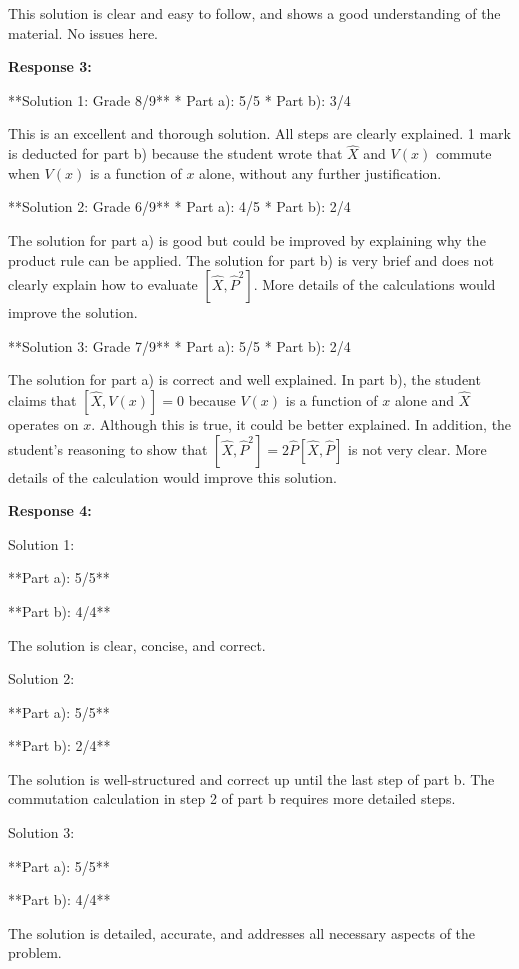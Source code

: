 \documentclass[a4paper,11pt]{article}
\begin{document}
This solution is clear and easy to follow, and shows a good understanding of the material. No issues here.

\bigskip    
\textbf{Response 3:}

**Solution 1: Grade 8/9**
*   Part a): 5/5
*   Part b): 3/4

This is an excellent and thorough solution. All steps are clearly explained. 1 mark is deducted for part b) because the student wrote that \(\hat{X}\) and \(V(x)\) commute when \(V(x)\) is a function of \(x\) alone, without any further justification.

**Solution 2: Grade 6/9**
*   Part a): 4/5
*   Part b): 2/4

The solution for part a) is good but could be improved by explaining why the product rule can be applied. The solution for part b) is very brief and does not clearly explain how to evaluate \(\left[ \hat{X}, \hat{P}^2 \right]\). More details of the calculations would improve the solution.

**Solution 3: Grade 7/9**
*   Part a): 5/5
*   Part b): 2/4

The solution for part a) is correct and well explained. In part b), the student claims that \(\left[ \hat{X}, V(x)\right] = 0\) because \(V(x)\) is a function of \(x\) alone and \(\hat{X}\) operates on \(x\). Although this is true, it could be better explained. In addition, the student's reasoning to show that \(\left[ \hat{X}, \hat{P}^2 \right] = 2\hat{P}\left[ \hat{X}, \hat{P} \right]\) is not very clear. More details of the calculation would improve this solution.

\bigskip    
\textbf{Response 4:}

Solution 1:

**Part a): 5/5**

**Part b): 4/4**

The solution is clear, concise, and correct.

Solution 2:

**Part a): 5/5**

**Part b): 2/4**

The solution is well-structured and correct up until the last step of part b. The commutation calculation in step 2 of part b requires more detailed steps.

Solution 3:

**Part a): 5/5**

**Part b): 4/4**

The solution is detailed, accurate, and addresses all necessary aspects of the problem.
\end{document}
